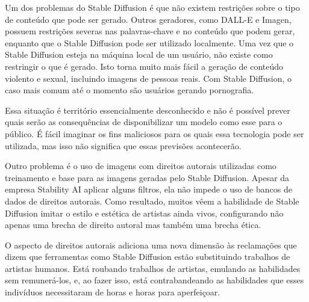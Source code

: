Um dos problemas do Stable Diffusion é que não existem restrições sobre o tipo de conteúdo que pode ser gerado. Outros geradores, como DALL-E e Imagen, possuem restrições severas nas palavras-chave e no conteúdo que podem gerar, enquanto que o Stable Diffusion pode ser utilizado localmente. Uma vez que o Stable Diffusion esteja na máquina local de um usuário, não existe como restringir o que é gerado. Isto torna muito mais fácil a geração de conteúdo violento e sexual, incluindo imagens de pessoas reais. Com Stable Diffusion, o caso mais comum até o momento são usuários gerando pornografia.



Essa situação é território essencialmente desconhecido e não é possível prever quais serão as consequências de disponibilizar um modelo como esse para o público. É fácil imaginar os fins maliciosos para os quais essa tecnologia pode ser utilizada, mas isso não significa que essas previsões acontecerão.



Outro problema é o uso de imagens com direitos autorais utilizadas como treinamento e base para as imagens geradas pelo Stable Diffusion. Apesar da empresa Stability AI aplicar alguns filtros, ela não impede o uso de bancos de dados de direitos autorais. Como resultado, muitos vêem a habilidade de Stable Diffusion imitar o estilo e estética de artistas ainda vivos, configurando não apenas uma brecha de direito autoral mas também uma brecha ética.



O aspecto de direitos autorais adiciona uma nova dimensão às reclamações que dizem que ferramentas como Stable Diffusion estão substituindo trabalhos de artistas humanos. Está roubando trabalhos de artistas, emulando as habilidades sem remunerá-los, e, ao fazer isso, está contrabandeando as habilidades que esses indivíduos necessitaram de horas e horas para aperfeiçoar.
